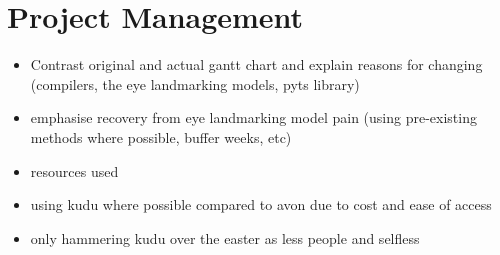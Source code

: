 \chapter{Project Management}
\label{ch:projman}

\begin{itemize}
    \item Contrast original and actual gantt chart and explain reasons for changing (compilers, the eye landmarking models, pyts library)
    \item emphasise recovery from eye landmarking model pain (using pre-existing methods where possible, buffer weeks, etc)
    \item resources used
    \item using kudu where possible compared to avon due to cost and ease of access
    \item only hammering kudu over the easter as less people and selfless
\end{itemize}